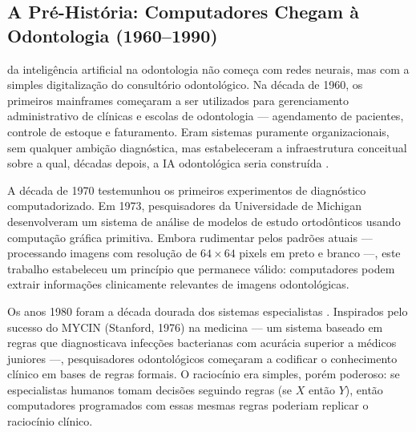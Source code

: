 \subsection{A Pré-História: Computadores Chegam à Odontologia (1960--1990)}

 da inteligência artificial na odontologia não começa com redes neurais, mas com a simples digitalização do consultório odontológico. Na década de 1960, os primeiros mainframes começaram a ser utilizados para gerenciamento administrativo de clínicas e escolas de odontologia — agendamento de pacientes, controle de estoque e faturamento. Eram sistemas puramente organizacionais, sem qualquer ambição diagnóstica, mas estabeleceram a infraestrutura conceitual sobre a qual, décadas depois, a IA odontológica seria construída .

A década de 1970 testemunhou os primeiros experimentos de diagnóstico computadorizado. Em 1973, pesquisadores da Universidade de Michigan desenvolveram um sistema de análise de modelos de estudo ortodônticos usando computação gráfica primitiva. Embora rudimentar pelos padrões atuais — processando imagens com resolução de $64 \times 64$ pixels em preto e branco —, este trabalho estabeleceu um princípio que permanece válido: computadores podem extrair informações clinicamente relevantes de imagens odontológicas.

Os anos 1980 foram a década dourada dos sistemas especialistas . Inspirados pelo sucesso do MYCIN (Stanford, 1976) na medicina — um sistema baseado em regras que diagnosticava infecções bacterianas com acurácia superior a médicos juniores —, pesquisadores odontológicos começaram a codificar o conhecimento clínico em bases de regras formais. O raciocínio era simples, porém poderoso: se especialistas humanos tomam decisões seguindo regras (se $X$ então $Y$), então computadores programados com essas mesmas regras poderiam replicar o raciocínio clínico.


